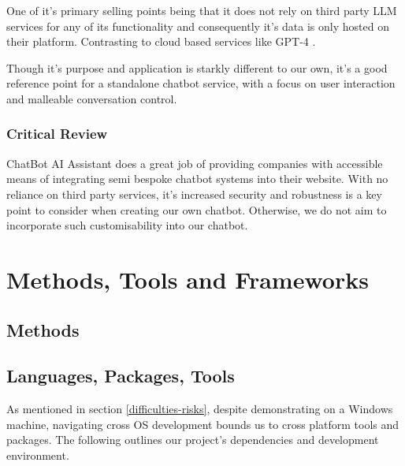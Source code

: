 \documentclass[11pt]{article}
\begin{document}
One of it's primary selling points being that it does not rely on third party LLM services for any of its functionality and consequently it's data is only hosted on their platform. Contrasting to cloud based services like GPT-4 \cite{gpt4}.

Though it's purpose and application is starkly different to our own, it's a good reference point for a standalone chatbot service, with a focus on user interaction and malleable conversation control.

\subsubsection{Critical Review}
ChatBot AI Assistant does a great job of providing companies with accessible means of integrating semi bespoke chatbot systems into their website. With no reliance on third party services, it's increased security and robustness is a key point to consider when creating our own chatbot. Otherwise, we do not aim to incorporate such customisability into our chatbot.

\section{Methods, Tools and Frameworks} \label{methods-tools-frameworks}


\subsection{Methods} \label{methods}

   



            

\subsection{Languages, Packages, Tools} \label{languages-packages-tools}

As mentioned in section \ref{difficulties-risks}, despite demonstrating on a Windows \cite{windows} machine, navigating cross OS development bounds us to cross platform tools and packages. The following outlines our project's dependencies and development environment.
\end{document}
